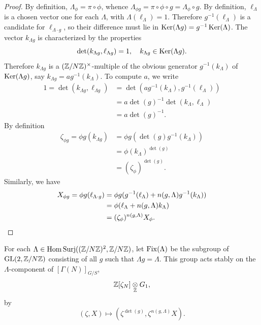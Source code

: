 \begin{proof}
By definition, $\Lambda_\phi = \pi \circ \phi$, whence $\Lambda_{\phi g} = \pi \circ \phi \circ g = \Lambda_\phi \circ g$. By definition, $\ell_\Lambda$ is a chosen vector one for each $\Lambda$, with $\Lambda(\ell_\Lambda) = 1$. Therefore $g^{-1}(\ell_\Lambda)$ is a candidate for $\ell_{\Lambda \cdot g}$, so their difference must lie in $\operatorname{Ker}(\Lambda g) = g^{-1}\operatorname{Ker}(\Lambda)$. The vector $k_{\Lambda g}$ is characterized by the properties
\[
\det(k_{\Lambda g}, \ell_{\Lambda g}) = 1, \quad k_{\Lambda g} \in \operatorname{Ker}(\Lambda g) .
\]
Therefore $k_{\Lambda g}$ is a $(\mathbb{Z}/N\mathbb{Z})^\times$-multiple of the obvious generator $g^{-1}(k_\Lambda)$ of $\operatorname{Ker}(\Lambda g)$, say $k_{\Lambda g} = a g^{-1}(k_\Lambda)$. To compute $a$, we write
\begin{align*}
1 = \det(k_{\Lambda g}, \ell_{\Lambda g}) & = \det(a g^{-1}(k_\Lambda), g^{-1}(\ell_\Lambda)) \\
& = a \det(g)^{-1} \det(k_\Lambda, \ell_\Lambda) \\
& = a \det(g)^{-1} .
\end{align*}
By definition
\begin{align*}
\zeta_{\phi g} = \phi g(k_{\Lambda g}) & = \phi g(\det(g) g^{-1}(k_\Lambda)) \\
& = \phi(k_\Lambda)^{\det(g)} \\
& = (\zeta_\phi)^{\det(g)} .
\end{align*}
Similarly, we have
\begin{align*}
X_{\phi g} = \phi g(\ell_{\Lambda \cdot g}) & = \phi g(g^{-1}(\ell_\Lambda) + n(g,\Lambda) g^{-1}(k_\Lambda)) \\
& = \phi(\ell_\Lambda + n(g,\Lambda) k_\Lambda) \\
& = (\zeta_\phi)^{n(g,\Lambda)} X_\phi . \qedhere
\end{align*}
\end{proof}

\kmitem\label{item:10.3.3}
For each $\Lambda \in \mathrm{Hom\,Surj}((\mathbb{Z}/N\mathbb{Z})^2, \mathbb{Z}/N\mathbb{Z})$, let $\operatorname{Fix}(\Lambda)$ be the subgroup of $\operatorname{GL}(2,\mathbb{Z}/N\mathbb{Z})$ consisting of all $g$ such that $\Lambda g = \Lambda$. This group acts stably on the $\Lambda$-component of $[\Gamma(N)]_{G/S}$,
\[
\mathbb{Z}[\zeta_N] \underset{\mathbb{Z}}{\otimes} G_1 ,
\]
by
\[
(\zeta, X) \mapsto (\zeta^{\det(g)}, \zeta^{n(g,\Lambda)} X) .
\]

